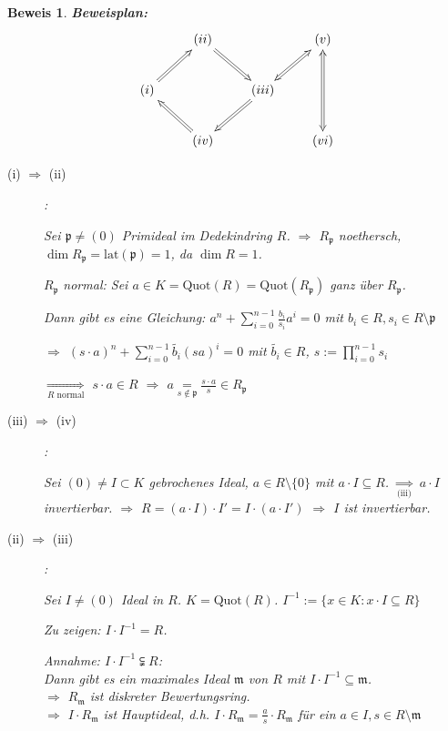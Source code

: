 \documentclass[a4paper,12pt]{scrbook}
\theoremstyle{break}
\theoremstyle{nonumberbreak}
\newtheorem{Bew}{Beweis}
\theoremstyle{nonumberplain}
\begin{document}
\begin{Bew}

\textbf{Beweisplan:}
\[
\begin{xy}
\xymatrix{
                 & (ii) \ar@{=>}[dr] &                              & (v) \ar@{<=>}[dd] \\
(i) \ar@{=>}[ur] &                   & (iii) \ar@{=>}[dl] \ar@{<=>}[ur] \\
                 & (iv) \ar@{=>}[ul] &                              & (vi) 
}
\end{xy}
\]

\begin{description}
\item[(i) $\Rightarrow$ (ii)]:

Sei $\mathfrak{p} \neq (0)$ Primideal im Dedekindring $R$. $\Rightarrow$ $R_\mathfrak{p}$ noethersch, $\dim R_\mathfrak{p} = \textrm{lat}(\mathfrak{p}) = 1$, da $\dim R = 1$.

$R_\mathfrak{p}$ normal: Sei $a \in K = \textrm{Quot}(R) = \textrm{Quot}(R_\mathfrak{p})$ ganz über $R_\mathfrak{p}$.

Dann gibt es eine Gleichung: $a^n + \sum_{i=0}^{n-1} \frac{b_i}{s_i} a^i = 0$ mit $b_i \in R, s_i \in R \setminus \mathfrak{p}$

$\Rightarrow$ $(s \cdot a)^n + \sum_{i=0}^{n-1} \widetilde{b_i} (s a)^i = 0$ mit $\widetilde{b_i} \in R$, $s := \prod_{i=0}^{n-1} s_i$

$\underset{R \text{ normal}}{\Longrightarrow}$ $s \cdot a \in R$ $\Rightarrow$ $a \underset{s \notin \mathfrak{p}}{=} \frac{s \cdot a}{s} \in R_\mathfrak{p}$

\item[(iii) $\Rightarrow$ (iv)]:

Sei $(0) \neq I \subset K$ gebrochenes Ideal, $a \in R \setminus \{0\}$ mit $a \cdot I \subseteq R$. $\underset{\text{(iii)}}{\Rightarrow}$ $a \cdot I$ invertierbar. $\Rightarrow$ $R = (a \cdot I) \cdot I' = I \cdot (a \cdot I')$ $\Rightarrow$ $I$ ist invertierbar.

\item[(ii) $\Rightarrow$ (iii)]:

Sei $I \neq (0)$ Ideal in $R$. $K = \textrm{Quot}(R)$. $I^{-1} := \{ x \in K : x \cdot I \subseteq R \}$
	
Zu zeigen: $I \cdot I^{-1} = R$.

Annahme: $I \cdot I^{-1} \subsetneqq R$:\\
Dann gibt es ein maximales Ideal $\mathfrak{m}$ von $R$ mit $I \cdot I^{-1} \subseteq \mathfrak{m}$.\\
$\Rightarrow$ $R_\mathfrak{m}$ ist diskreter Bewertungsring.\\
$\Rightarrow$ $I \cdot R_\mathfrak{m}$ ist Hauptideal, d.h. $I \cdot R_\mathfrak{m} = \frac{a}{s} \cdot R_\mathfrak{m}$ für ein $a \in I, s \in R \setminus \mathfrak{m}$


\end{description}
\end{Bew}
\end{document}

